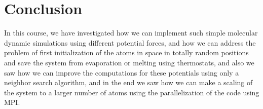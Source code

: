 \chapter{Conclusion}\label{chap:conclusion}
In this course, we have investigated how we can implement such simple molecular dynamic simulations using different potential forces, and how we can address the problem of first initialization of the atoms in space in totally random positions and save the system from evaporation or melting using thermostats, and also we saw how we can improve the computations for these potentials using only a neighbor search algorithm, and in the end we saw how we can make a scaling of the system to a larger number of atoms using the parallelization of the code using MPI.